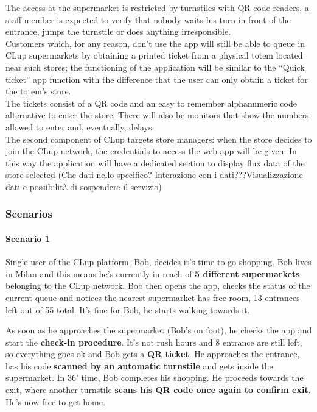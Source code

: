 The access at the supermarket is restricted by turnstiles with QR code readers, a staff member is expected to verify that nobody waits his turn in front of the entrance, jumps the turnstile or does anything irresponsible.\\
Customers which, for any reason, don’t use the app will still be able to queue in CLup supermarkets by obtaining a printed ticket from a physical totem located near such stores; the functioning of the application will be similar to the “Quick ticket” app function with the difference that the user can only obtain a ticket for the totem’s store. \\
The tickets consist of a QR code and an easy to remember alphanumeric code alternative to enter the store. There will also be monitors that show the numbers allowed to enter and, eventually, delays.\\
The second component of CLup targets store managers: when the store decides to join the CLup network, the credentials to access the web app will be given. In this way the application will have a dedicated section to display flux data of the store selected (Che dati nello specifico? Interazione con i dati???Visualizzazione dati e possibilità di sospendere il servizio)

\subsubsection{Scenarios}
\paragraph{Scenario 1}

Single user of the CLup platform, Bob, decides it's time to go shopping.
Bob lives in Milan and this means he's currently in reach of \textbf{5 different supermarkets} belonging to the CLup network. \newline
Bob then opens the app, checks the status of the current queue and notices the nearest supermarket has free room, 13 entrances left out of 55 total. It's fine for Bob, he starts walking towards it.

As soon as he approaches the supermarket (Bob's on foot), he checks the app and start the \textbf{check-in procedure}. It's not rush hours and 8 entrance are still left, so everything goes ok and Bob gets a \textbf{QR ticket}. He approaches the entrance, has his code \textbf{scanned by an automatic turnstile} and gets inside the supermarket.\newline
In 36' time, Bob completes his shopping. He proceeds towards the exit, where another turnstile \textbf{scans his QR code once again to confirm exit}. He's now free to get home.

